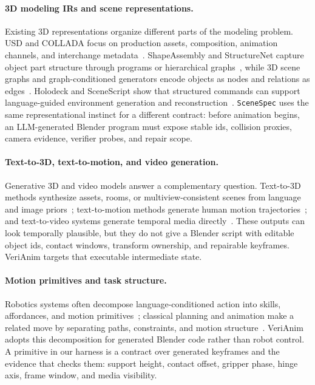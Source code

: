 \documentclass{article}
\newcommand{\code}[1]{\texttt{#1}}
\begin{document}
\paragraph{3D modeling IRs and scene representations.}
Existing 3D representations organize different parts of the modeling problem. USD and COLLADA focus on production assets, composition, animation channels, and interchange metadata~\citep{pixar2016usd,khronos2025collada}. ShapeAssembly and StructureNet capture object part structure through programs or hierarchical graphs~\citep{jones2020shapeassembly,mo2019structurenet}, while 3D scene graphs and graph-conditioned generators encode objects as nodes and relations as edges~\citep{armeni2019scenegraph,gao2024graphdreamer}. Holodeck and SceneScript show that structured commands can support language-guided environment generation and reconstruction~\citep{yang2024holodeck,avetisyan2024scenescript}. \code{SceneSpec} uses the same representational instinct for a different contract: before animation begins, an LLM-generated Blender program must expose stable ids, collision proxies, camera evidence, verifier probes, and repair scope.

\paragraph{Text-to-3D, text-to-motion, and video generation.}
Generative 3D and video models answer a complementary question. Text-to-3D methods synthesize assets, rooms, or multiview-consistent scenes from language and image priors~\citep{poole2022dreamfusion,lin2023magic3d,hollein2023text2room,shi2024mvdream,tang2024dreamgaussian}; text-to-motion methods generate human motion trajectories~\citep{tevet2023mdm,zhang2023t2mgpt}; and text-to-video systems generate temporal media directly~\citep{ho2022imagenvideo,blattmann2023align}. These outputs can look temporally plausible, but they do not give a Blender script with editable object ids, contact windows, transform ownership, and repairable keyframes. VeriAnim targets that executable intermediate state.

\paragraph{Motion primitives and task structure.}
Robotics systems often decompose language-conditioned action into skills, affordances, and motion primitives~\citep{huang2022inner,ahn2022can}; classical planning and animation make a related move by separating paths, constraints, and motion structure~\citep{lavalle2006planning,witkin1988spacetime}. VeriAnim adopts this decomposition for generated Blender code rather than robot control. A primitive in our harness is a contract over generated keyframes and the evidence that checks them: support height, contact offset, gripper phase, hinge axis, frame window, and media visibility.
\end{document}
